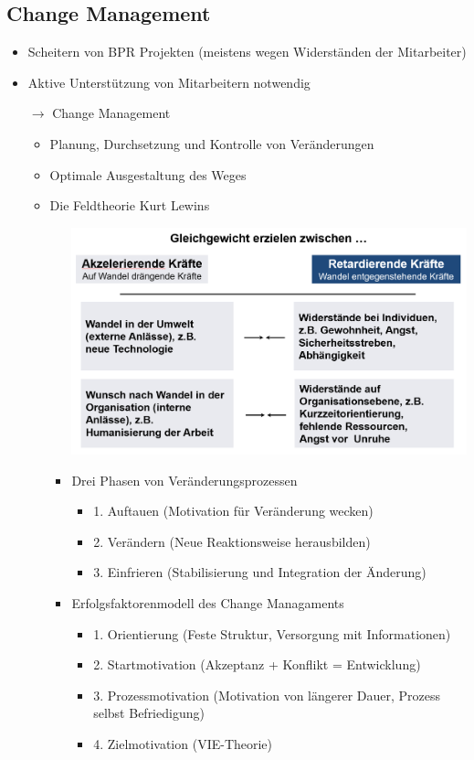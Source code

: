\documentclass[11pt,a4paper]{article}
\begin{document}
\subsection{Change Management}
\begin{itemize}

\item Scheitern von BPR Projekten (meistens wegen Widerständen der Mitarbeiter)
\item Aktive Unterstützung von Mitarbeitern notwendig
\item[$\rightarrow$] Change Management
	\begin{itemize}
	\item Planung, Durchsetzung und Kontrolle von Veränderungen
	\item Optimale Ausgestaltung des Weges
	\item Die Feldtheorie Kurt Lewins
		\begin{itemize} \vspace{0.3cm}
		\item[] \includegraphics[width=15cm]{kurtlewins1}
		\item Drei Phasen von Veränderungsprozessen
			\begin{itemize}
			\item 1. Auftauen (Motivation für Veränderung wecken)
			\item 2. Verändern (Neue Reaktionsweise herausbilden)
			\item 3. Einfrieren (Stabilisierung und Integration der Änderung)
			\end{itemize}
		\item Erfolgsfaktorenmodell des Change Managaments
			\begin{itemize}
			\item 1. Orientierung (Feste Struktur, Versorgung mit Informationen)
			\item 2. Startmotivation (Akzeptanz + Konflikt = Entwicklung)
			\item 3. Prozessmotivation (Motivation von längerer Dauer, Prozess selbst Befriedigung)
			\item 4. Zielmotivation (VIE-Theorie)
			\end{itemize}
		\end{itemize}
	\end{itemize}

\end{itemize}
\end{document}
